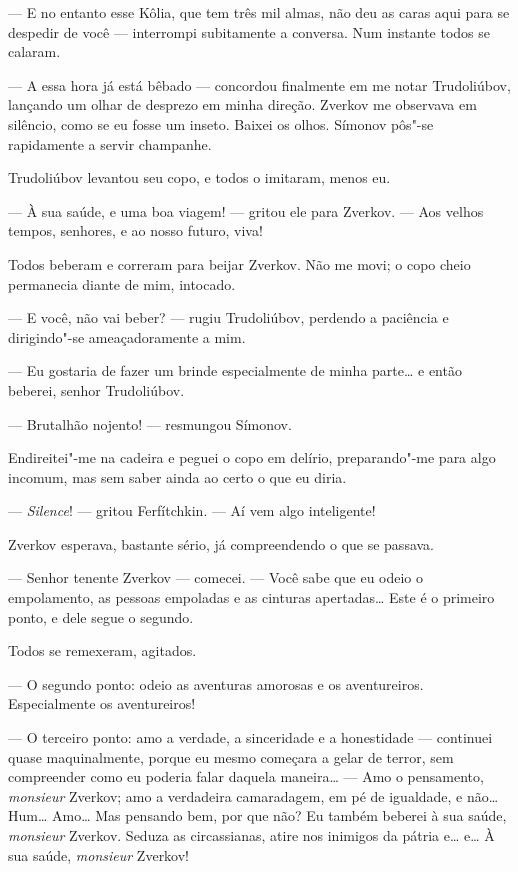 --- E no entanto esse Kôlia, que tem três mil almas, não deu as caras aqui
para se despedir de você --- interrompi subitamente a conversa. Num
instante todos se calaram.

--- A essa hora já está bêbado --- concordou finalmente em me notar
Trudoliúbov, lançando um olhar de desprezo em minha direção. Zverkov me
observava em silêncio, como se eu fosse um inseto. Baixei os olhos.
Símonov pôs"-se rapidamente a servir champanhe.

Trudoliúbov levantou seu copo, e todos o imitaram, menos eu.

--- À sua saúde, e uma boa viagem! --- gritou ele para Zverkov. --- Aos velhos
tempos, senhores, e ao nosso futuro, viva!

Todos beberam e correram para beijar Zverkov. Não me movi; o copo cheio
permanecia diante de mim, intocado.

--- E você, não vai beber? --- rugiu Trudoliúbov, perdendo a paciência e
dirigindo"-se ameaçadoramente a mim.

--- Eu gostaria de fazer um brinde especialmente de minha parte\ldots{} e então
beberei, senhor Trudoliúbov.

--- Brutalhão nojento! --- resmungou Símonov.

Endireitei"-me na cadeira e peguei o copo em delírio, preparando"-me para
algo incomum, mas sem saber ainda ao certo o que eu diria.

--- \textit{Silence}! --- gritou Ferfítchkin. --- Aí vem algo inteligente!

Zverkov esperava, bastante sério, já compreendendo o que se passava.

--- Senhor tenente Zverkov --- comecei. --- Você sabe que eu odeio o
empolamento, as pessoas empoladas e as cinturas apertadas\ldots{} Este é o
primeiro ponto, e dele segue o segundo.

Todos se remexeram, agitados.

--- O segundo ponto: odeio as aventuras amorosas e os aventureiros.
Especialmente os aventureiros!

--- O terceiro ponto: amo a verdade, a sinceridade e a honestidade ---
continuei quase maquinalmente, porque eu mesmo começara a gelar de
terror, sem compreender como eu poderia falar daquela maneira\ldots{} --- Amo
o pensamento, \textit{monsieur} Zverkov; amo a verdadeira camaradagem,
em pé de igualdade, e não\ldots{} Hum\ldots{} Amo\ldots{} Mas pensando bem, por que
não? Eu também beberei à sua saúde, \textit{monsieur} Zverkov. Seduza
as circassianas, atire nos inimigos da pátria e\ldots{} e\ldots{} À sua saúde,
\textit{monsieur} Zverkov!

